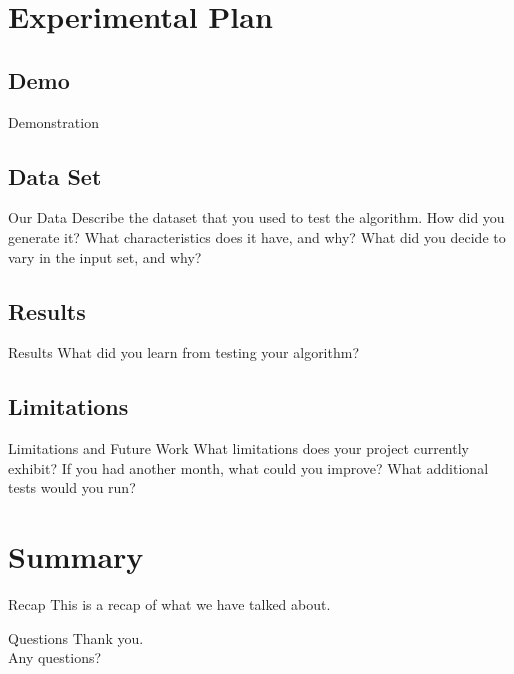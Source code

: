 \documentclass{beamer}
\begin{document}
\section{Experimental Plan}\frame{\sectionpage}
\subsection{Demo}
\begin{frame}{Demonstration}
\end{frame}

\subsection{Data Set}
\begin{frame}{Our Data}
    Describe the dataset that you used to test the algorithm. How did you
    generate it? What characteristics does it have, and why? What did you
    decide to vary in the input set, and why?
\end{frame}

\subsection{Results}
\begin{frame}{Results}
    What did you learn from testing your algorithm?
\end{frame}

\subsection{Limitations}
\begin{frame}{Limitations and Future Work}
    What limitations does your project currently exhibit? If you had another
    month, what could you improve? What additional tests would you run?
\end{frame}


\section{Summary}\frame{\sectionpage}
\begin{frame}{Recap}
    This is a recap of what we have talked about.
\end{frame}

\begin{frame}{Questions}
    Thank you.\\
    Any questions?
\end{frame}
\end{document}
